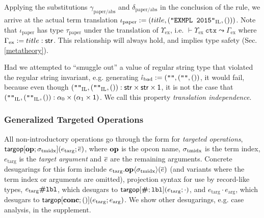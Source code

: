 Applying the substitutions $\gamma_\text{paper/abs}$ and $\delta_\text{paper/abs}$ in the conclusion of the rule, we arrive at the actual term translation $\iota_\text{paper} := (title, (\texttt{"EXMPL 2015"}_\text{IL}, ()))$. Note that $\iota_\text{paper}$ has type $\tau_\text{paper}$ under the translation of $\Upsilon_\text{ex}$, i.e. $\vdash \Upsilon_\text{ex}~\mathtt{ctx} \leadsto \Gamma_\text{ex}$ where $\Gamma_\text{ex} := title : {\sf str}$. This relationship will always hold, and implies type safety (Sec. \ref{metatheory}). 

Had we attempted to ``smuggle out'' a value of regular string type that violated the regular string invariant, e.g. generating $\hat{\iota}_\text{bad} := (\texttt{""}, (\texttt{""}, ())$, it would fail, because even though $(\texttt{""}_\text{IL}, (\texttt{""}_\text{IL}, ()) : {\sf str} \times {\sf str} \times {\sf 1}$, it is not the case that $(\texttt{""}_\text{IL}, (\texttt{""}_\text{IL}, ()) : \alpha_0 \times (\alpha_1 \times {\sf 1})$. We call this property \emph{translation independence}.


\subsubsection{Generalized Targeted Operations} \label{sec:targops}
\noindent All non-introductory operations go through the form for \emph{targeted operations}, ${\sf targop}[\textbf{op}; \sigma_\text{tmidx}](e_\text{targ}; \overline{e})$, where $\textbf{op}$ is the opcon name, ${\sigma_\text{tmidx}}$ is the term index, $e_\text{targ}$ is the \emph{target argument} and $\overline{e}$ are the remaining arguments. Concrete desugarings for this form include $e_\text{targ}.\textbf{op}\langle\sigma_\text{tmidx}\rangle(\overline{e})$ (and variants where the term index or arguments are omitted), projection syntax for use by record-like types, $e_\text{targ}\textbf{\#}\texttt{lbl}$, which desugars to ${\sf targop}[\textbf{\#}; \texttt{lbl}](e_\text{targ}; \cdot)$, and $e_\text{targ} \cdot e_\text{arg}$, which desugars to ${\sf targop}[\textbf{conc}; ()](e_\text{targ}; e_\text{arg})$. We show other desugarings, e.g. case analysis, in the supplement.


